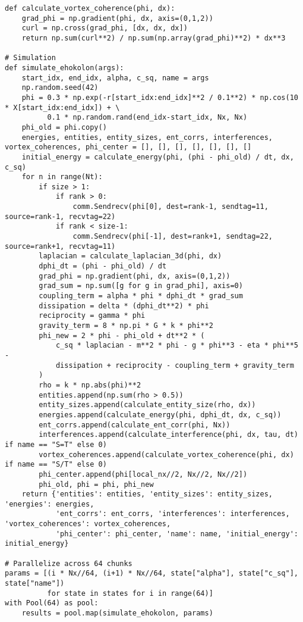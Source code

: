 \documentclass[11pt]{article}
\begin{document}
\begin{lstlisting}
def calculate_vortex_coherence(phi, dx):
    grad_phi = np.gradient(phi, dx, axis=(0,1,2))
    curl = np.cross(grad_phi, [dx, dx, dx])
    return np.sum(curl**2) / np.sum(np.array(grad_phi)**2) * dx**3

# Simulation
def simulate_ehokolon(args):
    start_idx, end_idx, alpha, c_sq, name = args
    np.random.seed(42)
    phi = 0.3 * np.exp(-r[start_idx:end_idx]**2 / 0.1**2) * np.cos(10 * X[start_idx:end_idx]) + \
          0.1 * np.random.rand(end_idx-start_idx, Nx, Nx)
    phi_old = phi.copy()
    energies, entities, entity_sizes, ent_corrs, interferences, vortex_coherences, phi_center = [], [], [], [], [], [], []
    initial_energy = calculate_energy(phi, (phi - phi_old) / dt, dx, c_sq)
    for n in range(Nt):
        if size > 1:
            if rank > 0:
                comm.Sendrecv(phi[0], dest=rank-1, sendtag=11, source=rank-1, recvtag=22)
            if rank < size-1:
                comm.Sendrecv(phi[-1], dest=rank+1, sendtag=22, source=rank+1, recvtag=11)
        laplacian = calculate_laplacian_3d(phi, dx)
        dphi_dt = (phi - phi_old) / dt
        grad_phi = np.gradient(phi, dx, axis=(0,1,2))
        grad_sum = np.sum([g for g in grad_phi], axis=0)
        coupling_term = alpha * phi * dphi_dt * grad_sum
        dissipation = delta * (dphi_dt**2) * phi
        reciprocity = gamma * phi
        gravity_term = 8 * np.pi * G * k * phi**2
        phi_new = 2 * phi - phi_old + dt**2 * (
            c_sq * laplacian - m**2 * phi - g * phi**3 - eta * phi**5 -
            dissipation + reciprocity - coupling_term + gravity_term
        )
        rho = k * np.abs(phi)**2
        entities.append(np.sum(rho > 0.5))
        entity_sizes.append(calculate_entity_size(rho, dx))
        energies.append(calculate_energy(phi, dphi_dt, dx, c_sq))
        ent_corrs.append(calculate_ent_corr(phi, Nx))
        interferences.append(calculate_interference(phi, dx, tau, dt) if name == "S=T" else 0)
        vortex_coherences.append(calculate_vortex_coherence(phi, dx) if name == "S/T" else 0)
        phi_center.append(phi[local_nx//2, Nx//2, Nx//2])
        phi_old, phi = phi, phi_new
    return {'entities': entities, 'entity_sizes': entity_sizes, 'energies': energies, 
            'ent_corrs': ent_corrs, 'interferences': interferences, 'vortex_coherences': vortex_coherences, 
            'phi_center': phi_center, 'name': name, 'initial_energy': initial_energy}

# Parallelize across 64 chunks
params = [(i * Nx//64, (i+1) * Nx//64, state["alpha"], state["c_sq"], state["name"]) 
          for state in states for i in range(64)]
with Pool(64) as pool:
    results = pool.map(simulate_ehokolon, params)
\end{lstlisting}
\end{document}
